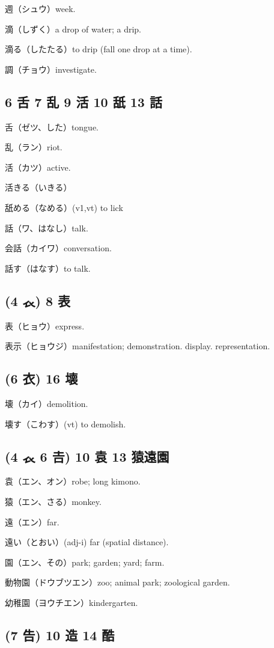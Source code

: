 週（シュウ）week.

滴（しずく）a drop of water; a drip.

滴る（したたる）to drip (fall one drop at a time).

調（チョウ）investigate.

\subsection{6 舌 7 乱 9 活 10 舐 13 話}

舌（ゼツ、した）tongue.

乱（ラン）riot.

活（カツ）active.

活きる（いきる）

舐める（なめる）(v1,vt) to lick

話（ワ、はなし）talk.

会話（カイワ）conversation.

話す（はなす）to talk.

\subsection{(4 𧘇) 8 表}

表（ヒョウ）express.

表示（ヒョウジ）manifestation; demonstration. display. representation.

\subsection{(6 衣) 16 壊}

壊（カイ）demolition.

壊す（こわす）(vt) to demolish.

\subsection{(4 𧘇 6 𠮷) 10 袁 13 猿遠園}

袁（エン、オン）robe; long kimono.

猿（エン、さる）monkey.

遠（エン）far.

遠い（とおい）(adj-i) far (spatial distance).

園（エン、その）park; garden; yard; farm.

動物園（ドウブツエン）zoo; animal park; zoological garden.

幼稚園（ヨウチエン）kindergarten.

\subsection{(7 告) 10 造 14 酷}

